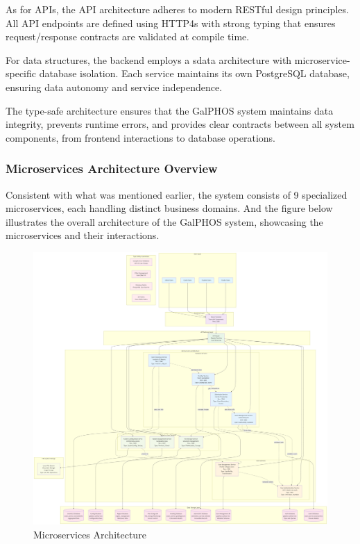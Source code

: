 \documentclass[12pt]{article}
\begin{document}
As for APIs, the API architecture adheres to modern RESTful design principles. All API endpoints are defined using HTTP4s with strong typing that ensures request/response contracts are validated at compile time. 

For data structures, the backend employs a sdata architecture with microservice-specific database isolation. Each service maintains its own PostgreSQL database, ensuring data autonomy and service independence.

The type-safe architecture ensures that the GalPHOS system maintains data integrity, prevents runtime errors, and provides clear contracts between all system components, from frontend interactions to database operations.

\subsubsection{Microservices Architecture Overview}

Consistent with what was mentioned earlier, the system consists of 9 specialized microservices, each handling distinct business domains. And the figure below illustrates the overall architecture of the GalPHOS system, showcasing the microservices and their interactions.

\begin{figure}[H]
    \centering
    \includegraphics[width=\textwidth]{Fig2.png}
    \caption{Microservices Architecture}
    \label{fig:ArchitectureOverview}
\end{figure}
\end{document}
